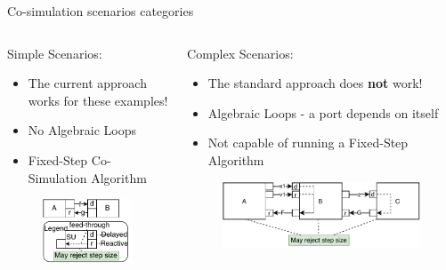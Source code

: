 \documentclass{beamer}
\begin{document}
\begin{frame}{Co-simulation scenarios categories}
    \begin{columns}[T] 
        \begin{column}{.48\textwidth}
        Simple Scenarios:
        \begin{itemize}
            \item The current approach works for these examples!
            \item No Algebraic Loops
            \item Fixed-Step Co-Simulation Algorithm
        \end{itemize}
        \begin{figure}
            \includegraphics[scale=0.6]{images/simple_example.pdf}
            \end{figure}
        \end{column}%
        \hfill%
        \begin{column}{.48\textwidth}
        Complex Scenarios:
        \begin{itemize}
            \item The standard approach does \textbf{not} work!
            \item Algebraic Loops - a port depends on itself
            \item Not capable of running a Fixed-Step Algorithm
        \end{itemize}
        \begin{figure}
            \includegraphics[scale=0.6]{images/loop_within_loop.pdf}
        \end{figure}
        \end{column}%
    \end{columns}
\end{frame}
\end{document}
